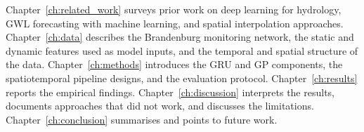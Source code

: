 Chapter~\ref{ch:related_work} surveys prior work on deep learning for hydrology, GWL forecasting with machine learning, and spatial interpolation approaches. Chapter~\ref{ch:data} describes the Brandenburg monitoring network, the static and dynamic features used as model inputs, and the temporal and spatial structure of the data. Chapter~\ref{ch:methods} introduces the GRU and GP components, the spatiotemporal pipeline designs, and the evaluation protocol. Chapter~\ref{ch:results} reports the empirical findings. Chapter~\ref{ch:discussion} interprets the results, documents approaches that did not work, and discusses the limitations. Chapter~\ref{ch:conclusion} summarises and points to future work.
